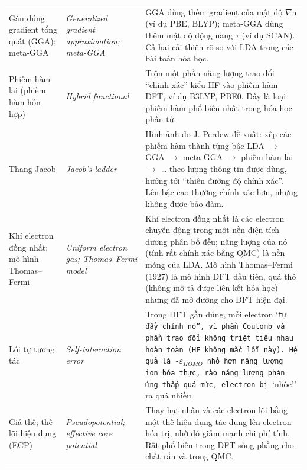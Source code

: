 \begin{longtable}{@{}>{\raggedright\arraybackslash}p{}>{\raggedright\arraybackslash\itshape}p{}>{\raggedright\arraybackslash}p{}@{}}
Gần đúng gradient tổng quát (GGA); meta-GGA & Generalized gradient approximation; meta-GGA & GGA dùng thêm gradient của mật độ $\nabla$n (ví dụ PBE, BLYP); meta-GGA dùng thêm mật độ động năng $\tau$ (ví dụ SCAN). Cả hai cải thiện rõ so với LDA trong các bài toán hóa học. \\[2pt]
Phiếm hàm lai (phiếm hàm hỗn hợp) & Hybrid functional & Trộn một phần năng lượng trao đổi ``chính xác'' kiểu HF vào phiếm hàm DFT, ví dụ B3LYP, PBE0. Đây là loại phiếm hàm phổ biến nhất trong hóa học phân tử. \\[2pt]
Thang Jacob & Jacob's ladder & Hình ảnh do J. Perdew đề xuất: xếp các phiếm hàm thành từng bậc LDA $\to$ GGA $\to$ meta-GGA $\to$ phiếm hàm lai $\to$ … theo lượng thông tin được dùng, hướng tới ``thiên đường độ chính xác''. Lên bậc cao thường chính xác hơn, nhưng không được bảo đảm. \\[2pt]
Khí electron đồng nhất; mô hình Thomas–Fermi & Uniform electron gas; Thomas–Fermi model & Khí electron đồng nhất là các electron chuyển động trong một nền điện tích dương phân bố đều; năng lượng của nó (tính rất chính xác bằng QMC) là nền móng của LDA. Mô hình Thomas–Fermi (1927) là mô hình DFT đầu tiên, quá thô (không mô tả được liên kết hóa học) nhưng đã mở đường cho DFT hiện đại. \\[2pt]
Lỗi tự tương tác & Self-interaction error & Trong DFT gần đúng, mỗi electron `\texttt{tự đẩy chính nó'', vì phần Coulomb và phần trao đổi không triệt tiêu nhau hoàn toàn (HF không mắc lỗi này). Hệ quả là -$\varepsilon_{HOMO}$ nhỏ hơn năng lượng ion hóa thực, rào năng lượng phản ứng thấp quá mức, electron bị }`nhòe'' ra quá nhiều. \\[2pt]
Giả thế; thế lõi hiệu dụng (ECP) & Pseudopotential; effective core potential & Thay hạt nhân và các electron lõi bằng một thế hiệu dụng tác dụng lên electron hóa trị, nhờ đó giảm mạnh chi phí tính. Rất phổ biến trong DFT sóng phẳng cho chất rắn và trong QMC. \\[2pt]
\bottomrule\end{longtable}
